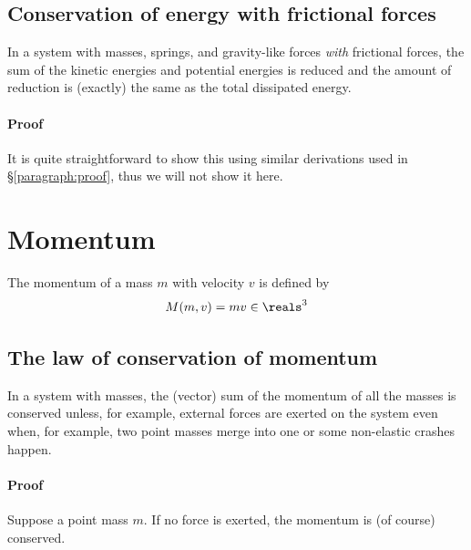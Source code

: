 \documentclass{article}
\begin{document}
\subsection{Conservation of energy with frictional forces}

In a system with masses, springs, and gravity-like forces \emph{with} frictional forces,
the sum of the kinetic energies and potential energies is reduced
and the amount of reduction is (exactly) the same as the total dissipated energy.

\paragraph{Proof}

It is quite straightforward to show this using similar derivations
used in \S\ref{paragraph:proof},
thus we will not show it here.


\section{Momentum}

The momentum of a mass $m$ with velocity $v$ is defined by
\begin{equation}
M(m,v) = mv \in\reals^3
\end{equation}

\subsection{The law of conservation of momentum}

In a system with masses,
the (vector) sum of the momentum of all the masses
is conserved
unless, for example, external forces are exerted on the system
even when, for example, two point masses merge into one or some non-elastic crashes happen.


\paragraph{Proof}

Suppose a point mass $m$.
If no force is exerted, the momentum is (of course) conserved.
\end{document}
